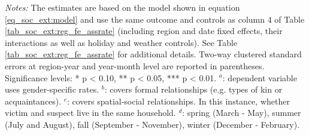 \begin{table}[ht]
\begin{threeparttable}
{\begin{tabular}{l*{6}{c}}
				
				\bottomrule 
		\end{tabular}}
		\begin{tablenotes} 
			\item \scriptsize \emph{Notes:} The estimates are based on the model shown in equation \ref{eq_soc_ext:model} and use the same outcome and controls as column 4 of Table \ref{tab_soc_ext:reg_fe_assrate} (including region and date fixed effects, their interactions as well as holiday and weather controls). See Table \ref{tab_soc_ext:reg_fe_assrate} for additional details. Two-way clustered standard errors at region-year and year-month level are reported in parentheses. \newline Significance levels: * p < 0.10, ** p < 0.05, *** p < 0.01.\newline\hspace*{15pt} $^a$: dependent variable uses gender-specific rates. \newline \hspace*{15pt} $^b$: covers formal relationships (e.g. types of kin or acquaintances). \newline \hspace*{15pt} $^c$: covers spatial-social relationships. In this instance, whether victim and suspect live in the same household.\newline \hspace*{15pt} $^d$: spring (March - May), summer (July and August), fall (September - November), winter (December - February).
		\end{tablenotes} 
	\end{threeparttable} 
\end{table}




